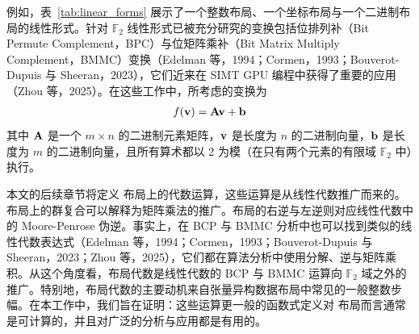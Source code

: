 例如，表~\ref{tab:linear_forms} 展示了一个整数布局、一个坐标布局与一个二进制布局的线性形式。针对 $\mathbb{F}_2$ 线性形式已被充分研究的变换包括位排列补（Bit Permute Complement，BPC）与位矩阵乘补（Bit Matrix Multiply Complement，BMMC）变换（Edelman 等，1994；Cormen，1993；Bouverot-Dupuis 与 Sheeran，2023），它们近来在 SIMT GPU 编程中获得了重要的应用（Zhou 等，2025）。在这些工作中，所考虑的变换为
\begin{align}
f(\mathbf{v}) = \mathbf{A} \mathbf{v} + \mathbf{b}
\label{eqn:linear}
\end{align}
其中 $\mathbf{A}$ 是一个 $m {\times} n$ 的二进制元素矩阵，$\mathbf{v}$ 是长度为 $n$ 的二进制向量，$\mathbf{b}$ 是长度为 $m$ 的二进制向量，且所有算术都以 2 为模（在只有两个元素的有限域 $\mathbb{F}_2$ 中）执行。

本文的后续章节将定义 \CuTe 布局上的代数运算，这些运算是从线性代数推广而来的。\CuTe 布局上的群复合可以解释为矩阵乘法的推广。\CuTe 布局的右逆与左逆则对应线性代数中的 Moore-Penrose 伪逆。事实上，在 BCP 与 BMMC 分析中也可以找到类似的线性代数表达式（Edelman 等，1994；Cormen，1993；Bouverot-Dupuis 与 Sheeran，2023；Zhou 等，2025），它们都在算法分析中使用分解、逆与矩阵乘积。从这个角度看，\CuTe 布局代数是线性代数的 BCP 与 BMMC 运算向 $\mathbb{F}_2$ 域之外的推广。特别地，\CuTe 布局代数的主要动机来自张量异构数据布局中常见的一般整数步幅。在本工作中，我们旨在证明：这些运算更一般的函数式定义对 \CuTe 布局而言通常是可计算的，并且对广泛的分析与应用都是有用的。
